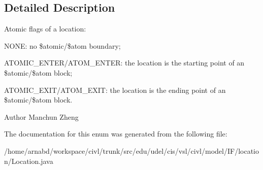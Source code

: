 \subsection{Detailed Description}
Atomic flags of a location\+: 


\begin{DoxyItemize}
\item N\+O\+N\+E\+: no \$atomic/\$atom boundary; 
\item A\+T\+O\+M\+I\+C\+\_\+\+E\+N\+T\+E\+R/\+A\+T\+O\+M\+\_\+\+E\+N\+T\+E\+R\+: the location is the starting point of an \$atomic/\$atom block; 
\item A\+T\+O\+M\+I\+C\+\_\+\+E\+X\+I\+T/\+A\+T\+O\+M\+\_\+\+E\+X\+I\+T\+: the location is the ending point of an \$atomic/\$atom block. 
\end{DoxyItemize}

\begin{DoxyAuthor}{Author}
Manchun Zheng 
\end{DoxyAuthor}


The documentation for this enum was generated from the following file\+:\begin{DoxyCompactItemize}
\item 
/home/arnabd/workspace/civl/trunk/src/edu/udel/cis/vsl/civl/model/\+I\+F/location/Location.\+java\end{DoxyCompactItemize}
